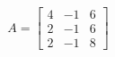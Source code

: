 \documentclass[preview]{standalone}
\begin{document}
\begin{align*}
A = \begin{bmatrix} 4 & -1 & 6 \\ 2 & -1 & 6 \\ 2 & -1 & 8 \end{bmatrix}
\end{align*}
\end{document}
